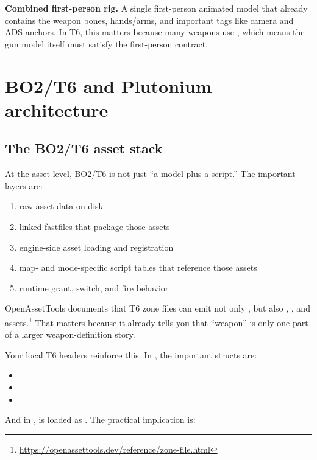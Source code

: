 \documentclass[11pt]{article}
\begin{document}
\textbf{Combined first-person rig.} A single first-person animated model that already contains the weapon bones, hands/arms, and important tags like camera and ADS anchors. In T6, this matters because many weapons use , which means the gun model itself must satisfy the first-person contract.

\section{BO2/T6 and Plutonium architecture}

\subsection{The BO2/T6 asset stack}

At the asset level, BO2/T6 is not just ``a model plus a script.'' The important layers are:

\begin{enumerate}
  \item raw asset data on disk
  \item linked fastfiles that package those assets
  \item engine-side asset loading and registration
  \item map- and mode-specific script tables that reference those assets
  \item runtime grant, switch, and fire behavior
\end{enumerate}

OpenAssetTools documents that T6 zone files can emit not only , but also , , and  assets.\footnote{\url{https://openassettools.dev/reference/zone-file.html}} That matters because it already tells you that ``weapon'' is only one part of a larger weapon-definition story.

Your local T6 headers reinforce this. In , the important structs are:

\begin{itemize}
  \item {}
  \item {}
  \item {}
\end{itemize}

And in ,  is loaded as . The practical implication is:
\end{document}
